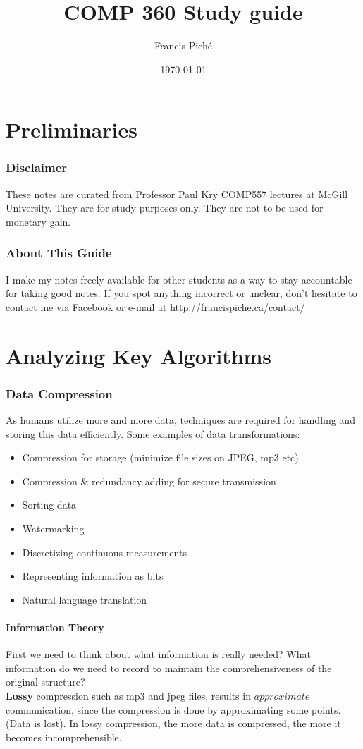 \documentclass[12pt]{article}
\theoremstyle{definition}
\begin{document}
\title{COMP 360 Study guide}
\author{Francis Pich\'e}
\date{\today}
\maketitle
\newpage
\tableofcontents
\newpage

\part{Preliminaries}
\section{Disclaimer}
These notes are curated from Professor Paul Kry COMP557 lectures at McGill University. They are for study purposes only. They are not to be used for monetary gain.
\section{About This Guide}
I make my notes freely available for other students as a way to stay accountable for taking good notes. If you spot anything incorrect or unclear, don't hesitate to contact me via Facebook or e-mail at \url{http://francispiche.ca/contact/}

\part{Analyzing Key Algorithms}
\section{Data Compression}
As humans utilize more and more data, techniques are required for handling and storing this data efficiently. Some examples of data transformations:
\begin{itemize}
	\item Compression for storage (minimize file sizes on JPEG, mp3 etc)
	\item Compression \& redundancy adding for secure transmission
	\item Sorting data
	\item Watermarking
	\item Discretizing continuous measurements
	\item Representing information as bits
	\item Natural language translation
\end{itemize}
\subsection{Information Theory}
First we need to think about what information is really needed? What information do we need to record to maintain the comprehensiveness of the original structure?
\\ \linebreak
\textbf{Lossy} compression such as mp3 and jpeg files, results in $approximate$ communication, since the compression is done by approximating some points. (Data is lost). In lossy compression, the more data is compressed, the more it becomes incomprehensible.
\\ \linebreak
\end{document}
